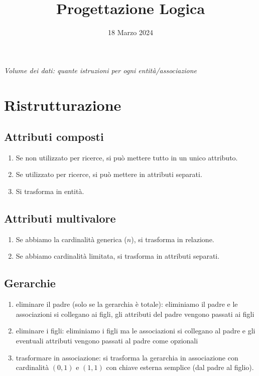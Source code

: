 \documentclass[12pt]{article}
\title{Progettazione Logica}
\date{18 Marzo 2024}
\begin{document}
\maketitle
\begin{center}
\end{center}
\textit{Volume dei dati: quante istruzioni per ogni entità/associazione}
\section{Ristrutturazione}
\subsection{Attributi composti}
\begin{enumerate}
    \item Se non utilizzato per ricerce, si può mettere tutto in un unico attributo.
    \item Se utilizzato per ricerce, si può mettere in attributi separati.
    \item Si trasforma in entità.
\end{enumerate}
\subsection{Attributi multivalore}
\begin{enumerate}
    \item Se abbiamo la cardinalità generica ($n$), si trasforma in relazione.
    \item Se abbiamo cardinalità limitata, si trasforma in attributi separati.
\end{enumerate}\newpage
\subsection{Gerarchie}
\begin{enumerate}
    \item eliminare il padre (solo se la gerarchia è totale): eliminiamo il padre e le associazioni si collegano ai figli, gli attributi del padre vengono passati ai figli
    \item eliminare i figli: eliminiamo i figli ma le associazioni si collegano al padre e  gli eventuali attributi vengono passati al padre come opzionali
    \item trasformare in associazione: si trasforma la gerarchia in associazione con cardinalità $(0,1)$ e $(1,1)$ con chiave esterna semplice (dal padre al figlio).
\end{enumerate}
\end{document}
